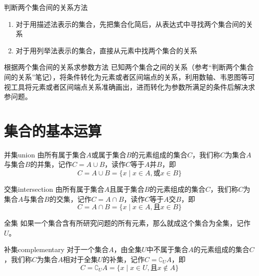 \begin{note}{判断两个集合间的关系方法}
	\begin{enumerate}
		\item 对于用描述法表示的集合，先把集合化简后，从表达式中寻找两个集合间的关系
		\item 对于用列举法表示的集合，直接从元素中找两个集合的关系
	\end{enumerate}
\end{note}


\begin{note}{根据两个集合间的关系求参数方法}
已知两个集合之间的关系（参考“判断两个集合间的关系”笔记），将条件转化为元素或者区间端点的关系，利用数轴、韦恩图等可视工具将元素或者区间端点关系准确画出，进而转化为参数所满足的条件后解决求参问题。
\end{note}


\section{集合的基本运算}

\begin{definition}{并集}{union}
由所有属于集合$A$\textcolor{third}{或}属于集合$B$的元素组成的集合$C$，我们称$C$为集合$A$与集合$B$的\textcolor{third}{并集}，记作$C = A \cup B$，读作$C$等于$A$并$B$，即
\begin{equation}
C = A \cup B = \{x \mid x \in A, \mbox{或} x \in B\}
\end{equation}
\end{definition}

\begin{definition}{交集}{intersection}
由所有属于集合$A$\textcolor{third}{且}属于集合$B$的元素组成的集合$C$，我们称$C$为集合$A$与集合$B$的\textcolor{third}{交集}，记作$C = A \cap B$，读作$C$等于$A$交$B$，即
\begin{equation}
C = A \cap B = \{x \mid x \in A,\mbox{且} x \in B\}
\end{equation}
\end{definition}

\begin{definition}{全集}
如果一个集合含有\textcolor{third}{所研究问题的所有元素}，那么就成这个集合为\textcolor{third}{全集}，记作$U$。
\end{definition}

\begin{definition}{补集}{complementary}
对于一个集合$A$，由全集$U$中\textcolor{third}{不属于}集合$A$的元素组成的集合$C$，我们称$C$为集合$A$相对于全集$U$的\textcolor{third}{补集}，记作$C = \complement_{U}{A}$，即
\begin{equation}
C = \complement_{U}{A} = \{x \mid x \in U,\mbox{且} x \notin A\}
\end{equation}
\end{definition}

